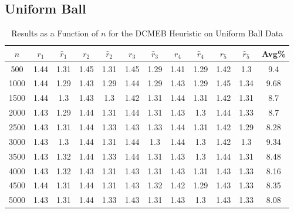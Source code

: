 \documentclass[11pt,twoside]{report}
\theoremstyle{definition}
\numberwithin{theorem}{section}
\numberwithin{definition}{section}
\numberwithin{lemma}{section}
\numberwithin{proposition}{section}
\numberwithin{equation}{section}
\numberwithin{figure}{section}
\begin{document}
\begin{appendices}
    \subsection{Uniform Ball}
    \begin{table}[ht]
        \centering
        \begin{tabular}{|c||cc||cc||cc||cc||cc||c|} \hline
            $n$&$r_1$&$\hat{r}_1$&$r_2$&$\hat{r}_2$&$r_3$&$\hat{r}_3$&$r_4$&$\hat{r}_4$&$r_5$&$\hat{r}_5$&Avg\% \\ \hline
            500&1.44&1.31&1.45&1.31&1.45&1.29&1.41&1.29&1.42&1.3&9.4 \\
            1000&1.44&1.29&1.43&1.29&1.44&1.29&1.43&1.29&1.45&1.34&9.68 \\
            1500&1.44&1.3&1.43&1.3&1.42&1.31&1.44&1.31&1.42&1.31&8.7 \\
            2000&1.43&1.29&1.44&1.31&1.44&1.31&1.43&1.3&1.44&1.33&8.7 \\
            2500&1.43&1.31&1.44&1.33&1.43&1.33&1.44&1.31&1.42&1.29&8.28 \\
            3000&1.43&1.3&1.44&1.31&1.44&1.3&1.44&1.3&1.42&1.3&9.34 \\
            3500&1.43&1.32&1.44&1.33&1.44&1.31&1.43&1.3&1.44&1.31&8.48 \\
            4000&1.43&1.32&1.43&1.31&1.43&1.31&1.43&1.31&1.43&1.33&8.16 \\
            4500&1.44&1.31&1.44&1.31&1.43&1.32&1.42&1.29&1.43&1.33&8.35 \\
            5000&1.43&1.31&1.44&1.33&1.43&1.31&1.43&1.3&1.43&1.33&8.08 \\ \hline
        \end{tabular}
        \caption{Results as a Function of $n$ for the DCMEB Heuristic on Uniform Ball Data}
        \label{tab:uniform_ball_dcmeb_table_n}
    \end{table}
    

\end{appendices}
\end{document}
